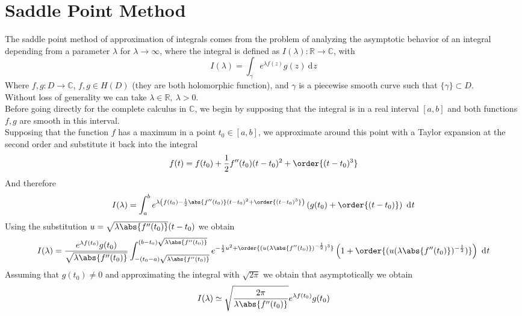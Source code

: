 \documentclass[a4paper, 11pt]{book}
\newcommand{\1}{\opr{\mathds{1}}}
\newcommand{\diff}[2][]{\ \mathrm{d}^{#1}#2}
\newcommand{\R}{\mathbb{R}}
\newcommand{\C}{\mathbb{C}}
\theoremstyle{plain}
\begin{document}
	\section{Saddle Point Method}
	The saddle point method of approximation of integrals comes from the problem of analyzing the asymptotic behavior of an integral depending from a parameter $\lambda$ for $\lambda\to\infty$, where the integral is defined as $I(\lambda):\R\to\C$, with
	\begin{equation}
		I(\lambda)=\int_{\gamma}e^{\lambda f(z)}g(z)\diff{z}
		\label{eq:saddlepointintegral}
	\end{equation}
	Where $f,g:D\to\C$, $f,g\in H(D)$ (they are both holomorphic function), and $\gamma$ is a piecewise smooth curve such that $\{\gamma\}\subset D$.\\
	Without loss of generality we can take $\lambda\in\R,\ \lambda>0$.\\
	Before going directly for the complete calculus in $\C$, we begin by supposing that the integral is in a real interval $[a,b]$ and both functions $f,g$ are smooth in this interval.\\
	Supposing that the function $f$ has a maximum in a point $t_0\in[a,b]$, we approximate around this point with a Taylor expansion at the second order and substitute it back into the integral
	\begin{equation*}
		f(t)=f(t_0)+\frac{1}{2}f''(t_0)(t-t_0)^2+\order{(t-t_0)^3}
	\end{equation*}
	And therefore
	\begin{equation}
		I(\lambda)=\int_{a}^{b}e^{\lambda\left( f(t_0)-\frac{1}{2}\abs{f''(t_0)}(t-t_0)^2+\order{(t-t_0)^3} \right)}\left( g(t_0)+\order{(t-t_0)} \right)\diff{t}
		\label{eq:Ilambdareal2ord}
	\end{equation}
	Using the substitution $u=\sqrt{\lambda\abs{f''(t_0)}}(t-t_0)$ we obtain
	\begin{equation}
		I(\lambda)=\frac{e^{\lambda f(t_0)}g(t_0)}{\sqrt{\lambda\abs{f''(t_0)}}}\int_{-(t_0-a)\sqrt{\lambda\abs{f''(t_0)}}}^{(b-t_0)\sqrt{\lambda\abs{f''(t_0)}}}e^{-\frac{1}{2}u^2+\order{(u(\lambda\abs{f''(t_0)})^{-\frac{1}{2}})^3}}\left( 1+\order{(u(\lambda\abs{f''(t_0)})^{-\frac{1}{2}})} \right)\diff{t}
		\label{eq:integralapproximated}
	\end{equation}
	Assuming that $g(t_0)\ne0$ and approximating the integral with $\sqrt{2\pi}$ we obtain that asymptotically we obtain
	\begin{equation}
		I(\lambda)\simeq\sqrt{\frac{2\pi}{\lambda\abs{f''(t_0)}}}e^{\lambda f(t_0)}g(t_0)
		\label{eq:Ilambdaapproximatedreal}
	\end{equation}
\end{document}
